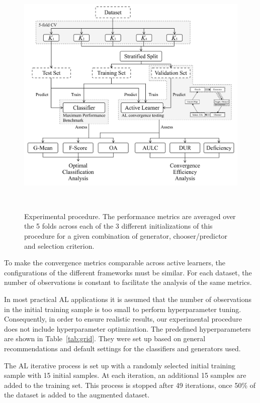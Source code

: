 \documentclass[parskip=full]{scrartcl}
\begin{document}
\begin{figure}[H]
	\centering
	\includegraphics[width=.7\linewidth]{../analysis/experiment_pipeline}
    \caption{Experimental procedure. The performance metrics are averaged over
    the 5 folds across each of the 3 different initializations of this
    procedure for a given combination of generator, chooser/predictor and
    selection criterion.}~\label{fig:experiment_pipeline}
\end{figure}

To make the convergence metrics comparable across active learners, the
configurations of the different frameworks must be similar. For each dataset,
the number of observations is constant to facilitate the analysis of the same
metrics. 

In most practical AL applications it is assumed that the number of observations
in the initial training sample is too small to perform hyperparameter tuning.
Consequently, in order to ensure realistic results, our experimental procedure
does not include hyperparameter optimization. The predefined hyperparameters
are shown in Table~\ref{tab:grid}. They were set up based on general
recommendations and default settings for the classifiers and generators used.

The AL iterative process is set up with a randomly selected initial training
sample with 15 initial samples. At each iteration, an additional 15 samples are
added to the training set. This process is stopped after 49 iterations, once
50\% of the dataset is added to the augmented dataset.
\end{document}
